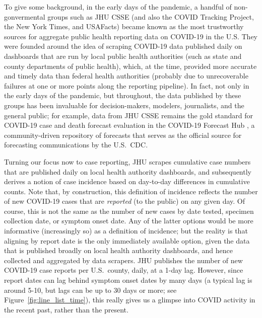 \documentclass[sts]{imsart}
\theoremstyle{plain}
\theoremstyle{definition}
\theoremstyle{remark}
\begin{document}
To give some background, in the early days of the pandemic, a handful of
non-gonvermental groups such as JHU CSSE \citep{Dong:2020} (and also the COVID
Tracking Project, the New York Times, and USAFacts) became known as the most 
trustworthy sources for aggregate public health reporting data on COVID-19 in
the U.S. They were founded around the idea of scraping COVID-19 data published
daily on dashboards that are run by local public health authorities (such as
state and county departments of public health), which, at the time, provided
more accurate and timely data than federal health authorities (probably due to
unrecoverable failures at one or more points along the reporting pipeline). In
fact, not only in the early days of the pandemic, but throughout, the data
published by these groups has been invaluable for decision-makers, modelers,
journalists, and the general public; for example, data from JHU CSSE remains the
gold standard for COVID-19 case and death forecast evaluation in the COVID-19
Forecast Hub \citep{ForecastHub}, a community-driven repository of forecasts
that serves as the official source for forecasting communications by the U.S.\
CDC.

Turning our focus now to case reporting, JHU scrapes cumulative case numbers
that are published daily on local health authority dashboards, and subsequently
derives a notion of case incidence based on day-to-day differences in cumulative
counts. Note that, by construction, this definition of incidence reflects the
number of new COVID-19 cases that are \emph{reported} (to the public) on any
given day. Of course, this is not the same as the number of new cases 
by date tested, specimen collection date, or symptom onset date. Any of the
latter options would be more informative (increasingly so) as a definition of 
incidence; but the reality is that aligning by report date is the only
immediately available option, given the data that is published broadly on local
health authority dashboards, and hence collected and aggregated by data
scrapers. JHU publishes the number of new COVID-19 case reports per U.S.\
county, daily, at a 1-day lag. However, since report dates can lag behind
symptom onset dates by many days (a typical lag is around 5-10, but lags can be
up to 30 days or more; see Figure~\ref{fig:line_list_time}), this really gives
us a glimpse into COVID activity in the recent past, rather than the present.
\end{document}

